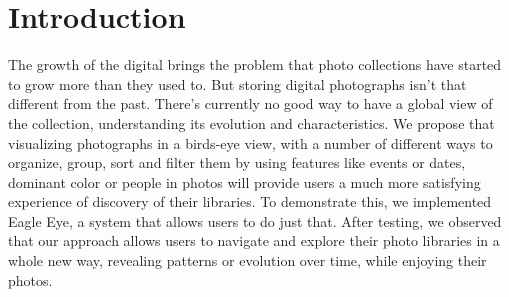\section{Introduction} %
\label{introduction}

The growth of the digital brings the problem that photo collections have started to grow more than they used to. But storing digital photographs isn't that different from the past. There's currently no good way to have a global view of the collection, understanding its evolution and characteristics.
We propose that visualizing photographs in a birds-eye view, with a number of different ways to organize, group, sort and filter them by using features like events or dates, dominant color or people in photos will provide users a much more satisfying experience of discovery of their libraries.
To demonstrate this, we implemented Eagle Eye, a system that allows users to do just that. After testing, we observed that our approach allows users to navigate and explore their photo libraries in a whole new way, revealing patterns or evolution over time, while enjoying their photos.

